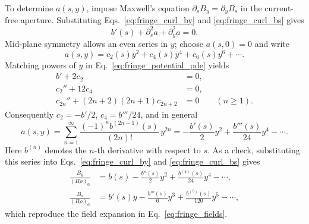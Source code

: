 To determine $a(s,y)$, impose Maxwell's equation
$\partial_s B_y=\partial_y B_s$ in the current-free aperture. Substituting
Eqs.~\eqref{eq:fringe_curl_by} and \eqref{eq:fringe_curl_bs} gives
\begin{equation}
 b'(s)+\partial_s^2 a+\partial_y^2 a=0.
 \label{eq:fringe_potential_pde}
\end{equation}
Mid-plane symmetry allows an even series in $y$; choose $a(s,0)=0$ and write
\begin{equation}
 a(s,y)=c_2(s)y^2+c_4(s)y^4+c_6(s)y^6+\cdots.
\end{equation}
Matching powers of $y$ in Eq.~\eqref{eq:fringe_potential_pde} yields
\begin{align}
 b'+2c_2&=0,\\
 c_2''+12c_4&=0,\\
 c_{2n}''+(2n+2)(2n+1)c_{2n+2}&=0\qquad(n\geq1).
\end{align}
Consequently $c_2=-b'/2$, $c_4=b'''/24$, and in general
\begin{equation}
 a(s,y)=\sum_{n=1}^{\infty}
 \frac{(-1)^n b^{(2n-1)}(s)}{(2n)!}\,y^{2n}
 =-\frac{b'(s)}{2}y^2+\frac{b'''(s)}{24}y^4-\cdots.
 \label{eq:fringe_ax_series}
\end{equation}
Here $b^{(n)}$ denotes the $n$-th derivative with respect to $s$.
As a check, substituting this series into
Eqs.~\eqref{eq:fringe_curl_by} and \eqref{eq:fringe_curl_bs} gives
\begin{align}
 \frac{B_y}{(B\rho)_0}
 &=b(s)-\frac{b''(s)}2y^2+\frac{b^{(4)}(s)}{24}y^4-\cdots,\\
 \frac{B_s}{(B\rho)_0}
 &=b'(s)y-\frac{b'''(s)}6y^3+\frac{b^{(5)}(s)}{120}y^5-\cdots,
\end{align}
which reproduce the field expansion in Eq.~\eqref{eq:fringe_fields}.

